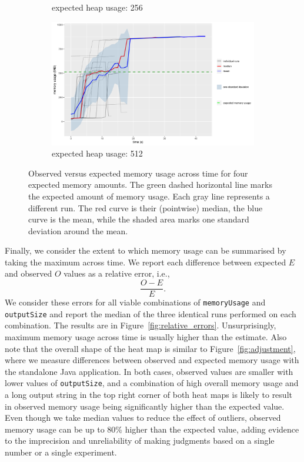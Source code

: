 \documentclass{article}
\begin{document}
\begin{figure}
\begin{subfigure}[t]{0.49\textwidth}
    \caption{expected heap usage: \SI{256}{\mebi\byte}}
    \label{fig:heap_256}
  \end{subfigure}
  \begin{subfigure}[t]{0.49\textwidth}
    \centering
    \includegraphics[width=\textwidth]{../plots/heap_512.png}
    \caption{expected heap usage: \SI{512}{\mebi\byte}}
    \label{fig:heap_512}
  \end{subfigure}
  \caption{Observed versus expected memory usage across time for four expected
    memory amounts. The green dashed horizontal line marks the expected amount
    of memory usage. Each gray line represents a different run. The red curve is
    their (pointwise) median, the blue curve is the mean, while the shaded area
    marks one standard deviation around the mean.}
  \label{fig:heap_experiment}
\end{figure}

Finally, we consider the extent to which memory usage can be summarised by
taking the maximum across time. We report each difference between expected $E$
and observed $O$ values as a relative error, i.e.,
\[
  \frac{O - E}{E}.
\]
We consider these errors for all viable combinations of \texttt{memoryUsage} and
\texttt{outputSize} and report the median of the three identical runs performed
on each combination. The results are in Figure~\ref{fig:relative_errors}.
Unsurprisingly, maximum memory usage across time is usually higher than the
estimate. Also note that the overall shape of the heat map is similar to
Figure~\ref{fig:adjustment}, where we measure differences between observed and
expected memory usage with the standalone Java application. In both cases,
observed values are smaller with lower values of \texttt{outputSize}, and a
combination of high overall memory usage and a long output string in the top
right corner of both heat maps is likely to result in observed memory usage
being significantly higher than the expected value. Even though we take median
values to reduce the effect of outliers, observed memory usage can be up to 80\%
higher than the expected value, adding evidence to the imprecision and
unreliability of making judgments based on a single number or a single
experiment.
\end{document}
